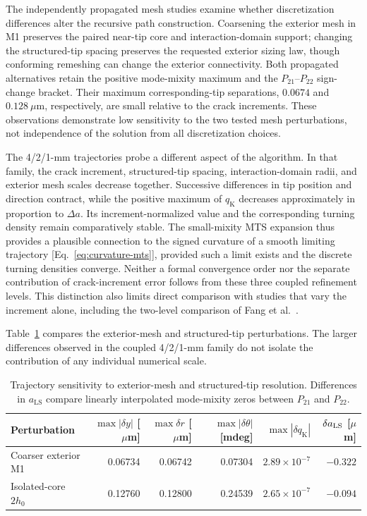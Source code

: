 \documentclass[11pt]{article}
\begin{document}
The independently propagated mesh studies examine whether
discretization differences alter the recursive path construction.
Coarsening the exterior mesh in M1 preserves the paired near-tip
core and interaction-domain support; changing the structured-tip
spacing preserves the requested exterior sizing law, though
conforming remeshing can change the exterior connectivity.
Both propagated alternatives retain the positive mode-mixity
maximum and the $P_{21}$--$P_{22}$ sign-change bracket.
Their maximum corresponding-tip separations, $0.0674$ and
$0.128~\mu\mathrm{m}$, respectively, are small relative to
the crack increments. These observations demonstrate low
sensitivity to the two tested mesh perturbations, not
independence of the solution from all discretization choices.

The 4/2/1-mm trajectories probe a different aspect of the
algorithm. In that family, the crack increment, structured-tip
spacing, interaction-domain radii, and exterior mesh scales
decrease together. Successive differences in tip position and
direction contract, while the positive maximum of
$q_{\mathrm{K}}$ decreases approximately in proportion to
$\Delta a$. Its increment-normalized value and the
corresponding turning density remain comparatively stable.
The small-mixity MTS expansion thus provides a plausible
connection to the signed curvature of a smooth limiting
trajectory [Eq.~\eqref{eq:curvature-mts}], provided such a
limit exists and the discrete turning densities converge.
Neither a formal convergence order nor the separate
contribution of crack-increment error follows from these
three coupled refinement levels. This distinction also
limits direct comparison with studies that vary the
increment alone, including the two-level comparison of
Fang et al.~\cite{FangEtAl2020}.

Table~\ref{tab:independent-sensitivity} compares the
exterior-mesh and structured-tip perturbations. The larger
differences observed in the coupled 4/2/1-mm family do
not isolate the contribution of any individual numerical scale.

\begin{table}[tbp]
\centering
\small
\setlength{\tabcolsep}{4.2pt}
\caption{Trajectory sensitivity to exterior-mesh and structured-tip
resolution. Differences in $a_{\mathrm{LS}}$ compare linearly
interpolated mode-mixity zeros between $P_{21}$ and $P_{22}$.}
\label{tab:independent-sensitivity}
\begin{tabular}{lrrrrr}
\toprule
Perturbation &
$\max|\delta y|$ [$\mu$m] &
$\max\delta r$ [$\mu$m] &
$\max|\delta\theta|$ [mdeg] &
$\max|\delta q_{\mathrm{K}}|$ &
$\delta a_{\rm LS}$ [$\mu$m]\\
\midrule
Coarser exterior M1 & 0.06734 & 0.06742 & 0.07304 & $2.89\times10^{-7}$ & $-0.322$\\
Isolated-core $2h_0$ & 0.12760 & 0.12800 & 0.24539 & $2.65\times10^{-7}$ & $-0.094$\\
\bottomrule
\end{tabular}
\end{table}
\end{document}
